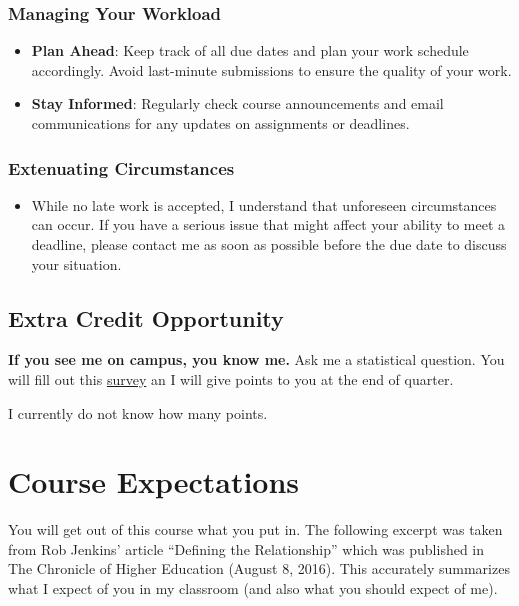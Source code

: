 \documentclass[
  11pt,
  letterpaper,
  DIV=11,
  numbers=noendperiod]{scrartcl}
\providecommand{\tightlist}{%
  \setlength{\itemsep}{0pt}\setlength{\parskip}{0pt}}\usepackage{longtable,booktabs,array}
\begin{document}
\hypertarget{managing-your-workload}{%
\subsubsection{Managing Your Workload}\label{managing-your-workload}}

\begin{itemize}
\tightlist
\item
  \textbf{Plan Ahead}: Keep track of all due dates and plan your work
  schedule accordingly. Avoid last-minute submissions to ensure the
  quality of your work.
\item
  \textbf{Stay Informed}: Regularly check course announcements and email
  communications for any updates on assignments or deadlines.
\end{itemize}

\hypertarget{extenuating-circumstances}{%
\subsubsection{Extenuating
Circumstances}\label{extenuating-circumstances}}

\begin{itemize}
\tightlist
\item
  While no late work is accepted, I understand that unforeseen
  circumstances can occur. If you have a serious issue that might affect
  your ability to meet a deadline, please contact me as soon as possible
  before the due date to discuss your situation.
\end{itemize}

\hypertarget{extra-credit-opportunity}{%
\subsection{Extra Credit Opportunity}\label{extra-credit-opportunity}}

\textbf{If you see me on campus, you know me.} Ask me a statistical
question. You will fill out this
\href{https://forms.gle/xf2oSkBiZDsBNJmu7}{survey} an I will give points
to you at the end of quarter.

I currently do not know how many points.

\hypertarget{course-expectations}{%
\section{Course Expectations}\label{course-expectations}}

You will get out of this course what you put in. The following excerpt
was taken from Rob Jenkins' article ``Defining the Relationship'' which
was published in The Chronicle of Higher Education (August 8, 2016).
This accurately summarizes what I expect of you in my classroom (and
also what you should expect of me).
\end{document}
